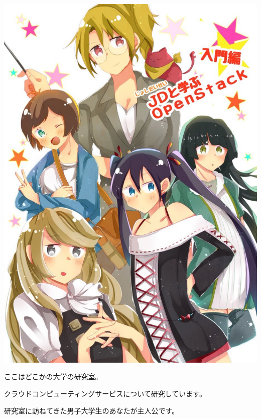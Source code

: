 \documentclass[8pt,b5paper,tombo,openany]{jsbook}
\begin{document}
\enlargethispage{\paperwidth}
\thispagestyle{empty}
\vspace*{-1truein}
\vspace*{-\topmargin}
\vspace*{-\headheight}
\vspace*{-1.05\headsep}
\vspace*{-\topskip}
\noindent\hspace*{-1in}\hspace*{-0.5\oddsidemargin}
\includegraphics[width=1.02\paperwidth]{./img/cover.pdf}

\newpage

\thispagestyle{empty}

ここはどこかの大学の研究室。

クラウドコンピューティングサービスについて研究しています。

研究室に訪ねてきた男子大学生のあなたが主人公です。
\end{document}
